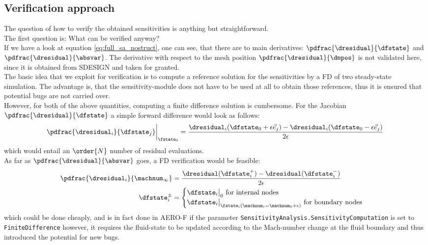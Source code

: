 \documentclass[../main.tex]{subfiles}
\begin{document}
\subsection{Verification approach}\label{sec:verification_approach}
The question of how to verify the obtained sensitivities is anything but straightforward.\\
The first question is: What can be verified anyway?\\
If we have a look at equation \eqref{eq:full_sa_nostruct}, one can see, that there are to main derivatives: $\pdfrac{\dresidual}{\dfstate}$ and $\pdfrac{\dresidual}{\absvar}$. The derivative with respect to the mesh position $\pdfrac{\dresidual}{\dmpos}$ is not validated here, since it is obtained from SDESIGN and taken for granted.\\
The basic idea that we exploit for verification is to compute a reference solution for the sensitivities by a \ac{FD} of two steady-state simulation. The advantage is, that the sensitivity-module does not have to be used at all to obtain those references, thus it is ensured that potential bugs are not carried over.\\
However, for both of the above quantities, computing a finite difference solution is cumbersome. For the Jacobian $\pdfrac{\dresidual}{\dfstate}$ a simple forward difference would look as follows:
\begin{align}
\pdfrac{\dresidual_i}{\dfstate_j}\bigg\rvert_{\fstate_0}=\frac{\dresidual_i(\dfstate_0+\epsilon\vec{e}_j)-\dresidual_i(\dfstate_0-\epsilon\vec{e}_j)}{2\epsilon}
\end{align}
which would entail an $\order{N}$ number of residual evaluations.\\
As far as $\pdfrac{\dresidual}{\absvar}$ goes, a \ac{FD} verification would be feasible:
\begin{align}
\pdfrac{\dresidual_i}{\machnum_{\infty}}&=\frac{\dresidual(\dfstate_i^{+})-\dresidual(\dfstate_i^{-})}{2\epsilon} \nonumber \\
\dfstate_i^{\pm} &=
\begin{cases}
\dfstate_i\big\rvert_{0}\text{   for internal nodes}\\
\dfstate_i\big\rvert_{\fstate_i(\machnum_i=\machnum_0+\epsilon)}\text{   for boundary nodes}
\end{cases}
\end{align}
which could be done cheaply, and is in fact done in AERO-F if the parameter \texttt{SensitivityAnalysis.SensitivityComputation} is set to \texttt{FiniteDifference} however, it requires the fluid-state to be updated according to the Mach-number change at the fluid boundary and thus introduced the potential for new bugs.\\
\end{document}
